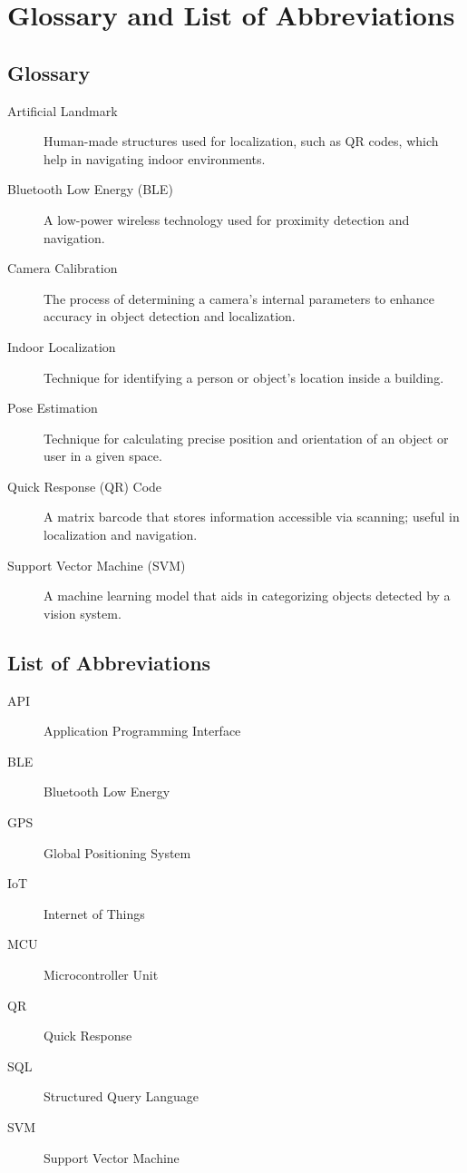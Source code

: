 

\chapter*{Glossary and List of Abbreviations}

\section*{Glossary}
\begin{description}
	\item[Artificial Landmark] Human-made structures used for localization, such as QR codes, which help in navigating indoor environments.
	\item[Bluetooth Low Energy (BLE)] A low-power wireless technology used for proximity detection and navigation.
	\item[Camera Calibration] The process of determining a camera's internal parameters to enhance accuracy in object detection and localization.
	\item[Indoor Localization] Technique for identifying a person or object’s location inside a building.
	\item[Pose Estimation] Technique for calculating precise position and orientation of an object or user in a given space.
	\item[Quick Response (QR) Code] A matrix barcode that stores information accessible via scanning; useful in localization and navigation.
	\item[Support Vector Machine (SVM)] A machine learning model that aids in categorizing objects detected by a vision system.
\end{description}

\section*{List of Abbreviations}
\begin{description}
	\item[API] Application Programming Interface
	\item[BLE] Bluetooth Low Energy
	\item[GPS] Global Positioning System
	\item[IoT] Internet of Things
	\item[MCU] Microcontroller Unit
	\item[QR] Quick Response
	\item[SQL] Structured Query Language
	\item[SVM] Support Vector Machine
\end{description}
